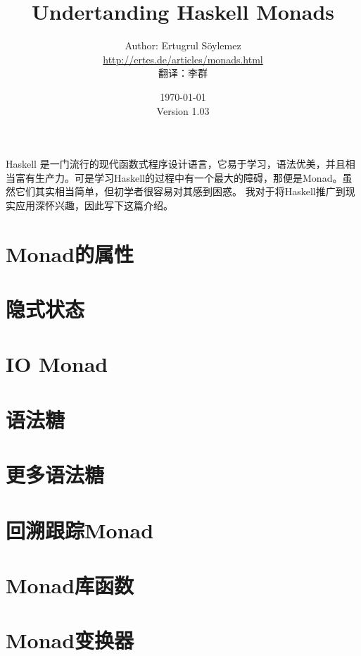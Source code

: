 \documentclass[11pt]{article} %
\title{Undertanding Haskell Monads}
\author{Author: Ertugrul S\"oylemez\\
\url{http://ertes.de/articles/monads.html}\\[2mm]
翻译：李群}
\date{\today\\
Version 1.03}
\begin{document}
\maketitle

Haskell 是一门流行的现代函数式程序设计语言，它易于学习，语法优美，并且相当富有生产力。可是学习Haskell的过程中有一个最大的障碍，那便是Monad。虽然它们其实相当简单，但初学者很容易对其感到困惑。 我对于将Haskell推广到现实应用深怀兴趣，因此写下这篇介绍。

\renewcommand\contentsname{目录}
\tableofcontents






\section{Monad的属性}
\section{隐式状态}
\section{IO Monad}
\section{语法糖}
\section{更多语法糖}
\section{回溯跟踪Monad}
\section{Monad库函数}
\section{Monad变换器}
\end{document}

